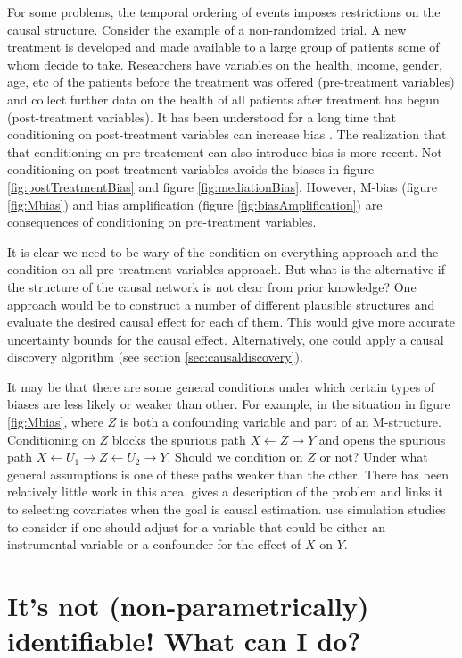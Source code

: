 \documentclass[11pt,a4paper]{article}
\begin{document}
For some problems, the temporal ordering of events imposes restrictions on the causal structure. Consider the example of a non-randomized trial. A new treatment is developed and made available to a large group of patients some of whom decide to take. Researchers have variables on the health, income, gender, age, etc of the patients before the treatment was offered (pre-treatment variables) and collect further data on the health of all patients after treatment has begun (post-treatment variables). It has been understood for a long time that conditioning on post-treatment variables can increase bias \cite{Rosenbaum1984a}. The realization that that conditioning on pre-treatement can also introduce bias is more recent. Not conditioning on post-treatment variables avoids the biases in figure \ref{fig:postTreatmentBias} and figure \ref{fig:mediationBias}. However, M-bias (figure \ref{fig:Mbias}) and bias amplification (figure \ref{fig:biasAmplification}) are consequences of conditioning on pre-treatment variables. 


It is clear we need to be wary of the condition on everything approach and the condition on all pre-treatment variables approach. But what is the alternative if the structure of the causal network is not clear from prior knowledge? One approach would be to construct a number of different plausible structures and evaluate the desired causal effect for each of them. This would give more accurate uncertainty bounds for the causal effect. Alternatively, one could apply a causal discovery algorithm (see section \ref{sec:causaldiscovery}). 

It may be that there are some general conditions under which certain types of biases are less likely or weaker than other. For example, in the situation in figure \ref{fig:Mbias}, where $Z$ is both a confounding variable and part of an M-structure. Conditioning on $Z$ blocks the spurious path $X \leftarrow Z \rightarrow Y$ and opens the spurious path $X \leftarrow U_{1} \rightarrow Z \leftarrow U_{2} \rightarrow Y$. Should we condition on $Z$ or not? Under what general assumptions is one of these paths weaker than the other. There has been relatively little work in this area. \cite{Vansteelandt2012} gives a description of the problem and links it to selecting covariates when the goal is causal estimation. \cite{Myers2011} use simulation studies to consider if one should adjust for a variable that could be either an instrumental variable or a confounder for the effect of $X$ on $Y$. 


\section{It's not (non-parametrically) identifiable! What can I do?}
\end{document}
